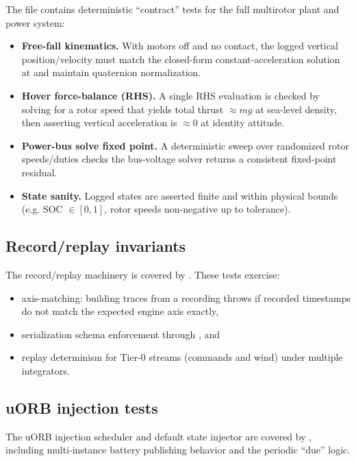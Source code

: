 The file  contains deterministic ``contract'' tests for the full multirotor plant and power system:
\begin{itemize}[leftmargin=*,itemsep=2pt]
  \item \textbf{Free-fall kinematics.} With motors off and no contact, the logged vertical position/velocity must match the closed-form constant-acceleration solution at  and maintain quaternion normalization.
  \item \textbf{Hover force-balance (RHS).} A single RHS evaluation is checked by solving for a rotor speed that yields total thrust \(\approx m g\) at sea-level density, then asserting vertical acceleration is \(\approx 0\) at identity attitude.
  \item \textbf{Power-bus solve fixed point.} A deterministic sweep over randomized rotor speeds/duties checks the bus-voltage solver returns a consistent fixed-point residual.
  \item \textbf{State sanity.} Logged states are asserted finite and within physical bounds (e.g. SOC \(\in[0,1]\), rotor speeds non-negative up to tolerance).
\end{itemize}

\subsection{Record/replay invariants}

The record/replay machinery is covered by . These tests exercise:
\begin{itemize}[leftmargin=*,itemsep=2pt]
  \item axis-matching: building traces from a recording throws if recorded timestamps do not match the expected engine axis exactly,
  \item serialization schema enforcement through , and
  \item replay determinism for Tier-0 streams (commands and wind) under multiple integrators.
\end{itemize}

\subsection{uORB injection tests}

The uORB injection scheduler and default state injector are covered by , including multi-instance battery publishing behavior and the periodic ``due'' logic.

